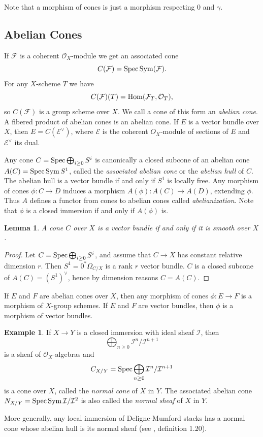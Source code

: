 \documentclass[11pt]{article}
\theoremstyle{plain}
\newtheorem{lem}[prop]{Lemma}
\theoremstyle{definition}
\newtheorem{examplep}{Example}\renewcommand{\theexamplep}{}
\newenvironment{example}{\begin{examplep}\normalfont}{\end{examplep}}
\newenvironment{pf}{\begin{proof}}{\end{proof}}
\renewcommand{\O}{{\mathcal{O}}}
\newcommand{\eE}{{\mathcal{E}}}
\newcommand{\iI}{{\mathcal{I}}}
\newcommand{\fF}{{\mathcal{F}}}
\newcommand{\spec}{\mathop{\rm Spec}\nolimits}
\newcommand{\Sym}{\mathop{\rm Sym}\nolimits}
\newcommand{\Hom}{\mathop{\rm Hom}\nolimits}
\theoremstyle{plain}
\theoremstyle{definition}
\theoremstyle{remark}
\begin{document}
Note that a morphism of cones is just a morphism respecting \(0\) and
\(\gamma\).

\subsection{Abelian Cones}

If \(\fF\) is a coherent \(\O_X\)-module we get an associated cone
\[
C(\fF)=\spec\Sym(\fF).
\]
For any \(X\)-scheme \(T\) we have
\[
C(\fF)(T)=\Hom(\fF_T,\O_T),
\]
so \(C(\fF)\) is a group scheme over \(X\). We call a cone of this form an
{\em abelian cone}. A fibered product of abelian cones is an abelian
cone. If \(E\) is a vector bundle over \(X\), then \(E=C(\eE^{\vee})\),
where \(\eE\) is the coherent \(O_X\)-module of sections of \(E\) and
\(\eE^{\vee}\) its dual.

Any cone \(C=\spec\bigoplus_{i\geq0}S^i\) is canonically a closed
subcone of an abelian cone \(A(C)=\spec\Sym S^1\), called the {\em
associated abelian cone }or the {\em abelian hull }of \(C\). The abelian
hull is a vector bundle if and only if \(S^1\) is locally free. Any
morphism of cones \(\phi:C\rightarrow D\) induces a morphism
\(A(\phi):A(C)\rightarrow A(D)\), extending \(\phi\). Thus \(A\) defines a
functor from cones to abelian cones called {\em abelianization}. Note
that \(\phi\) is a closed immersion if and only if \(A(\phi)\) is.

\begin{lem}
A cone \(C\) over \(X\) is a vector bundle if and only if it is smooth over \(X\).
\end{lem}
\begin{pf} Let \(C=\spec\bigoplus_{i\geq0}S^i\), and assume that \(C\to X\) has
constant relative dimension \(r\). Then \(S^1=0^*\Omega_{C/X}\) is a rank \(r\)
vector
bundle. \(C\) is a closed subcone of \(A(C)=(S^1)^\vee\), hence by dimension
reasons
\(C=A(C)\).
\end{pf}

If \(E\) and \(F\) are abelian cones over \(X\), then any morphism of cones
\(\phi:E\rightarrow F\) is a morphism of \(X\)-group schemes. If \(E\) and
\(F\) are vector bundles, then \(\phi\) is a morphism of vector bundles.

\begin{example} If \(X\rightarrow Y\) is a closed immersion with ideal sheaf
\(\iI\), then
\[
\bigoplus_{n\geq0}\iI^n/\iI^{n+1}
\]
is a sheaf of \(\O_X\)-algebras and
\[
C_{X/Y}=\spec
\bigoplus_{n\geq0}\iI^n/\iI^{n+1}
\]
is a cone over \(X\), called the {\em normal
cone }of \(X\) in \(Y\). The associated abelian cone \(N_{X/Y}=\spec\Sym\iI/\iI^2\)
is
also called the {\em normal sheaf }of
\(X\) in \(Y\).

More generally, any local immersion of Deligne-Mumford stacks has a normal cone
whose abelian hull is its normal sheaf (see \cite{vistoli}, definition 1.20).
\end{example}
\end{document}
